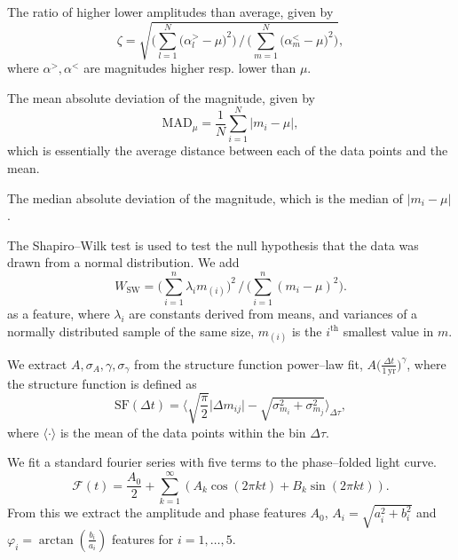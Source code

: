 \begin{enumerate}
 The ratio of higher \resp lower amplitudes than average, given by
\begin{equation}\zeta = \sqrt{ \Big(\sum\limits_{l=1}^N \big( \alpha^{>}_l - \mu \big)^2\Big) \, / \, \Big(\sum\limits_{m=1}^N \big( \alpha^{<}_m - \mu \big)^2\Big)},\end{equation}
where $\alpha^{>}, \alpha^{<}$ are magnitudes higher resp. lower than $\mu$.

 The mean absolute deviation of the magnitude, given by
\begin{equation}\text{MAD}_{\mu} = \frac{1}{N} \sum\limits_{i=1}^{N} | m_i - \mu |,\end{equation}
which is essentially the average distance between each of the data points and the mean.

 The median absolute deviation of the magnitude, which is the median of $| m_i - \mu |$.

 The Shapiro--Wilk test \citep{shapiro1965} is used to test the null hypothesis that the data was drawn from a normal distribution. We add
\begin{equation}W_{\text{SW}} = \big(\sum\limits_{i=1}^n \lambda_i m_{(i)}\big)^2 \, / \, \big(\sum\limits_{i=1}^n (m_i - \mu)^2\big).\end{equation}
as a feature, where $\lambda_i$ are constants derived from means, and variances of a normally distributed sample of the same size, $m_{(i)}$ is the $i^\text{th}$ smallest value in $m$.

 We extract $A, \sigma_A, \gamma, \sigma_\gamma$ from the structure function power--law fit, $A \big(\frac{\Delta t}{1 \, \mathrm{yr}}\big)^\gamma$, where the structure function is defined as
\begin{equation}\text{SF}(\Delta t) = \big\langle \sqrt{\frac{\pi}{2}} \big| \Delta m_{ij}  \big| - \sqrt{\sigma_{m_i}^2 + \sigma_{m_j}^2} \big\rangle_{\Delta \tau},\end{equation}
where $\langle \cdot \rangle$ is the mean of the data points within the bin $\Delta \tau$.

 We fit a standard fourier series with five terms to the phase--folded light curve.
\begin{equation}\label{eq:fourier-series-features}\mathcal{F}(t) = \frac{A_0}{2} + \sum_{k=1}^{\infty} ( A_k \cos(2 \pi k t) + B_k \sin(2 \pi k t) ).\end{equation}
From this we extract the amplitude and phase features $A_0$, $A_i = \sqrt{a_i^2 + b_i^2}$ and $\varphi_i = \arctan(\frac{b_i}{a_i})$ features for $i = 1, \ldots, 5$.


\end{enumerate}
